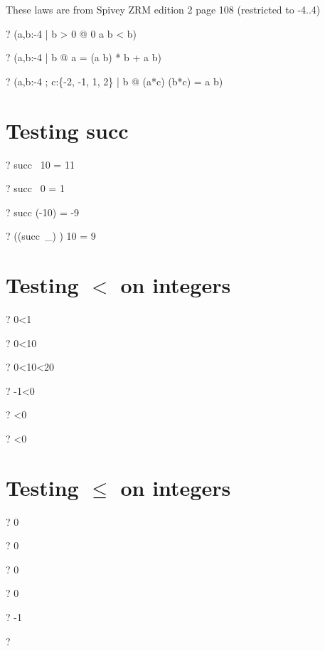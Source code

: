 \documentclass{article}
\newcommand{\negate}{-}
\begin{document}
 These laws are from Spivey ZRM edition 2 page 108 (restricted to -4..4)
\begin{zed} \vdash?   (\forall a,b:\negate 4  | b > 0 @ 0 \leq a \mod b < b) \end{zed}
\begin{zed} \vdash?   (\forall a,b:\negate 4  | b  @ a = (a \div b) * b + a \mod b) \end{zed}
\begin{zed} \vdash?   (\forall a,b:\negate 4 ; c:\{\negate 2, \negate 1, 1, 2\} | b  @ (a*c) \div (b*c) = a \div b) \end{zed}

\section{Testing succ}
\begin{zed} \vdash?   succ~ 10 = 11 \end{zed}
\begin{zed} \vdash?   succ~ 0 = 1 \end{zed}
\begin{zed} \vdash?   succ (\negate 10) = \negate 9 \end{zed}
\begin{zed} \vdash?   ((succ~\_) \inv) 10 = 9 \end{zed}

\section{Testing $<$ on integers}
\begin{zed} \vdash?   0<1 \end{zed}
\begin{zed} \vdash?   0<10 \end{zed}
\begin{zed} \vdash?   0<10<20 \end{zed}
\begin{zed} \vdash?   \negate 1<0 \end{zed}
\begin{zed} \vdash?   <0 \end{zed}
\begin{zed} \vdash?   <0 \end{zed}

\section{Testing $\leq$ on integers}
\begin{zed} \vdash?   0  \end{zed}
\begin{zed} \vdash?   0  \end{zed}
\begin{zed} \vdash?   0  \end{zed}
\begin{zed} \vdash?   0   \end{zed}
\begin{zed} \vdash?   \negate 1  \end{zed}
\begin{zed} \vdash?     \end{zed}
\end{document}
